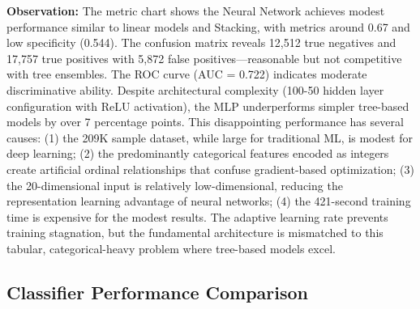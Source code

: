 \documentclass[stu,12pt,floatsintext]{apa7}
\begin{document}
\textbf{Observation:} The metric chart shows the Neural Network achieves modest performance similar to linear models and Stacking, with metrics around 0.67 and low specificity (0.544). The confusion matrix reveals 12,512 true negatives and 17,757 true positives with 5,872 false positives—reasonable but not competitive with tree ensembles. The ROC curve (AUC = 0.722) indicates moderate discriminative ability. Despite architectural complexity (100-50 hidden layer configuration with ReLU activation), the MLP underperforms simpler tree-based models by over 7 percentage points. This disappointing performance has several causes: (1) the 209K sample dataset, while large for traditional ML, is modest for deep learning; (2) the predominantly categorical features encoded as integers create artificial ordinal relationships that confuse gradient-based optimization; (3) the 20-dimensional input is relatively low-dimensional, reducing the representation learning advantage of neural networks; (4) the 421-second training time is expensive for the modest results. The adaptive learning rate prevents training stagnation, but the fundamental architecture is mismatched to this tabular, categorical-heavy problem where tree-based models excel.

\subsection{Classifier Performance Comparison}
\end{document}
